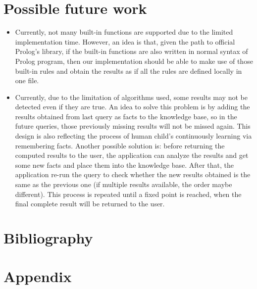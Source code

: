 \documentclass[11pt,a4paper]{report}
\begin{document}
\section*{Possible future work}
\begin{itemize}
	\item Currently, not many built-in functions are supported due to the limited implementation time. However, an idea is that, given the path to official Prolog's library, if the built-in functions are also written in normal syntax of Prolog program, then our implementation should be able to make use of those built-in rules and obtain the results as if all the rules are defined locally in one file.
	
	\item Currently, due to the limitation of algorithms used, some results may not be detected even if they are true. An idea to solve this problem is by adding the results obtained from last query as facts to the knowledge base, so in the future queries, those previously missing results will not be missed again. This design is also reflecting the process of  human child's continuously learning via remembering facts. Another possible solution is: before returning the computed results to the user, the application can analyze the results and get some new facts and place them into the knowledge base. After that, the application re-run the query to check whether the new results obtained is the same as the previous one (if multiple results available, the order maybe different). This process is repeated until a fixed point is reached, when the final complete result will be returned to the user. 
\end{itemize}


\section*{Bibliography}

\section*{Appendix}


\end{document}
